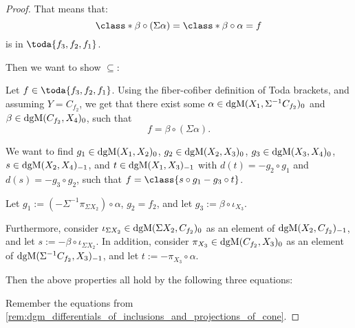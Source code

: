 \begin{proof}
    That means that:
    \[
        \class*{\beta \circ (\Sigma \alpha)} = \class*{\beta \circ \alpha} = f
    \]
    is in \( \toda{f_3, f_2, f_1} \).

    Then we want to show \( \subseteq \):

    Let \( f \in \toda{f_3, f_2, f_1} \). Using the fiber-cofiber definition of Toda brackets, and assuming \( Y = C_{f_2} \), we get that there exist some \( \alpha \in \operatorname{dgM}(X_1, \Sigma^{-1} C_{f_2})_0 \) and \( \beta \in \operatorname{dgM}(C_{f_2}, X_4)_0 \), such that
    \[
        f = \beta \circ (\Sigma \alpha).
    \]

    We want to find \( g_1 \in \operatorname{dgM}(X_1, X_2)_0 \), \( g_2 \in \operatorname{dgM}(X_2, X_3)_0 \), \( g_3 \in \operatorname{dgM}(X_3, X_4)_0 \), \( s \in \operatorname{dgM}(X_2, X_4)_{-1} \), and \( t \in \operatorname{dgM}(X_1, X_3)_{-1} \) with \( d(t) = - g_2 \circ g_1 \) and \( d(s) = -g_3 \circ g_2 \), such that \( f = \class{s \circ g_1 - g_3 \circ t} \).

    Let \( g_1 := (-\Sigma^{-1} \pi_{\Sigma X_2}) \circ \alpha \), \( g_2 = f_2 \), and let \( g_3 := \beta \circ \iota_{X_3} \). 

    Furthermore, consider \( \iota_{\Sigma X_2} \in \operatorname{dgM}(\Sigma X_2, C_{f_2})_0 \) as an element of \( \operatorname{dgM}(X_2, C_{f_2})_{-1} \), and let \( s := - \beta \circ \iota_{\Sigma X_2} \). In addition, consider \( \pi_{X_3} \in \operatorname{dgM}(C_{f_2}, X_3)_0 \) as an element of \( \operatorname{dgM}(\Sigma^{-1} C_{f_2}, X_3)_{-1} \), and let \( t := - \pi_{X_3} \circ \alpha \).

    Then the above properties all hold by the following three equations:

    Remember the equations from \autoref{rem:dgm_differentials_of_inclusions_and_projections_of_cone}.


\end{proof}
